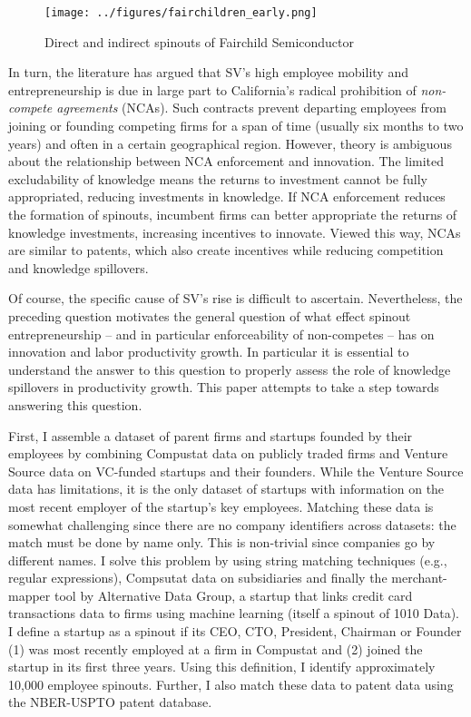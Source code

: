 \documentclass[11pt,english]{article}
\theoremstyle{remark}
\begin{document}
\begin{figure}	
	\center
	\texttt{[image: ../figures/fairchildren\_early.png]}
	\caption{Direct and indirect spinouts of Fairchild Semiconductor}
	\label{fairchild_spinouts}
\end{figure}



In turn, the literature has argued that SV's high employee mobility and entrepreneurship is due in large part to California's radical prohibition of \textit{non-compete agreements} (NCAs). Such contracts prevent departing employees from joining or founding competing firms for a span of time (usually six months to two years) and often in a certain geographical region. However, theory is ambiguous about the relationship between NCA enforcement and innovation. The limited excludability of knowledge means the returns to investment cannot be fully appropriated, reducing investments in knowledge. If NCA enforcement reduces the formation of spinouts, incumbent firms can better appropriate the returns of knowledge investments, increasing incentives to innovate. Viewed this way, NCAs are similar to patents, which also create incentives while reducing competition and knowledge spillovers.

Of course, the specific cause of SV's rise is difficult to ascertain. Nevertheless, the preceding question motivates the general question of what effect spinout entrepreneurship -- and in particular enforceability of non-competes -- has on innovation and labor productivity growth. In particular it is essential to understand the answer to this question to properly assess the role of knowledge spillovers in productivity growth. This paper attempts to take a step towards answering this question.

First, I assemble a dataset of parent firms and startups founded by their employees by combining Compustat data on publicly traded firms and Venture Source data on VC-funded startups and their founders. While the Venture Source data has limitations, it is the only dataset of startups with information on the most recent employer of the startup's key employees. Matching these data is somewhat challenging since there are no company identifiers across datasets: the match must be done by name only. This is non-trivial since companies go by different names. I solve this problem by using string matching techniques (e.g., regular expressions), Compsutat data on subsidiaries and finally the merchant-mapper tool by Alternative Data Group, a startup that links credit card transactions data to firms using machine learning (itself a spinout of 1010 Data). I define a startup as a spinout if its CEO, CTO, President, Chairman or Founder (1) was most recently employed at a firm in Compustat and (2) joined the startup in its first three years. Using this definition, I identify approximately 10,000 employee spinouts. Further, I also match these data to patent data using the NBER-USPTO patent database. 
\end{document}
